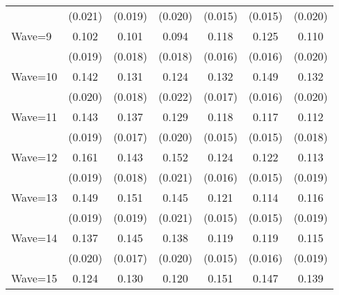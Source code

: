 {\begin{tabular}{l*{6}{c}}
                    &     (0.021)         &     (0.019)         &     (0.020)         &     (0.015)         &     (0.015)         &     (0.020)         \\
Wave=9              &       0.102\sym{***}&       0.101\sym{***}&       0.094\sym{***}&       0.118\sym{***}&       0.125\sym{***}&       0.110\sym{***}\\
                    &     (0.019)         &     (0.018)         &     (0.018)         &     (0.016)         &     (0.016)         &     (0.020)         \\
Wave=10             &       0.142\sym{***}&       0.131\sym{***}&       0.124\sym{***}&       0.132\sym{***}&       0.149\sym{***}&       0.132\sym{***}\\
                    &     (0.020)         &     (0.018)         &     (0.022)         &     (0.017)         &     (0.016)         &     (0.020)         \\
Wave=11             &       0.143\sym{***}&       0.137\sym{***}&       0.129\sym{***}&       0.118\sym{***}&       0.117\sym{***}&       0.112\sym{***}\\
                    &     (0.019)         &     (0.017)         &     (0.020)         &     (0.015)         &     (0.015)         &     (0.018)         \\
Wave=12             &       0.161\sym{***}&       0.143\sym{***}&       0.152\sym{***}&       0.124\sym{***}&       0.122\sym{***}&       0.113\sym{***}\\
                    &     (0.019)         &     (0.018)         &     (0.021)         &     (0.016)         &     (0.015)         &     (0.019)         \\
Wave=13             &       0.149\sym{***}&       0.151\sym{***}&       0.145\sym{***}&       0.121\sym{***}&       0.114\sym{***}&       0.116\sym{***}\\
                    &     (0.019)         &     (0.019)         &     (0.021)         &     (0.015)         &     (0.015)         &     (0.019)         \\
Wave=14             &       0.137\sym{***}&       0.145\sym{***}&       0.138\sym{***}&       0.119\sym{***}&       0.119\sym{***}&       0.115\sym{***}\\
                    &     (0.020)         &     (0.017)         &     (0.020)         &     (0.015)         &     (0.016)         &     (0.019)         \\
Wave=15             &       0.124\sym{***}&       0.130\sym{***}&       0.120\sym{***}&       0.151\sym{***}&       0.147\sym{***}&       0.139\sym{***}\\

\end{tabular}}
